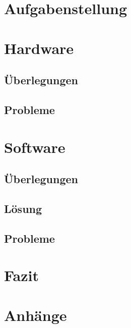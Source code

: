 \section{Aufgabenstellung}


\section{Hardware}
\subsection{Überlegungen}


\subsection{Probleme}


\newpage
\section{Software}
\subsection{Überlegungen}


\subsection{Lösung}


\subsection{Probleme}


\section{Fazit}


\section{Anhänge}

